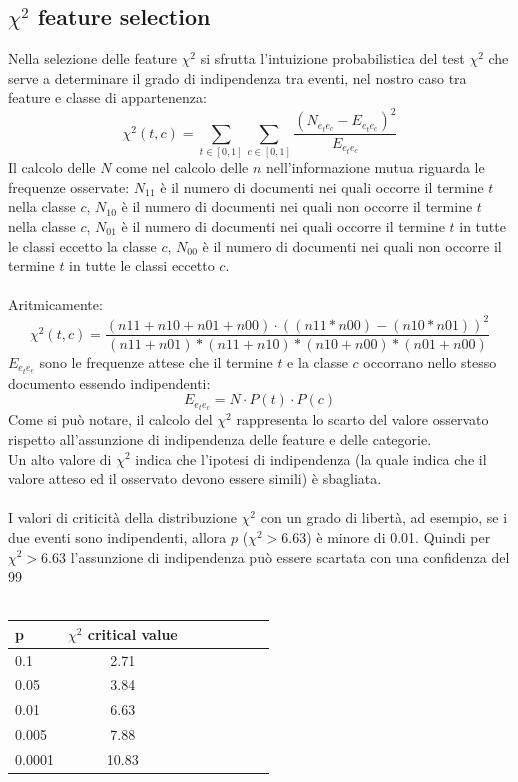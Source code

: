 \documentclass{article}
\theoremstyle{plain}
\theoremstyle{definition}
\begin{document}
\subsection{$\chi^2$ feature selection}
Nella selezione delle feature $\chi^2$ si sfrutta l'intuizione probabilistica del test $\chi^2$ che serve a determinare il grado di indipendenza tra eventi, nel nostro caso tra feature e classe di appartenenza:
$$\chi^2(t,c)=\sum_{t \in [0,1]} \sum_{c \in [0,1]} \frac{(N_{e_{t}e_{c}} - E_{e_{t}e_{c}})^2}{E_{e_{t}e_{c}}} $$  
Il calcolo delle $N$ come nel calcolo delle $n$ nell'informazione mutua riguarda le frequenze osservate: $N_{11}$ è il numero di documenti nei quali occorre il termine $t$ nella classe $c$, $N_{10}$ è il numero di documenti nei quali non occorre il termine $t$ nella classe $c$, $N_{01}$ è il numero di documenti nei quali occorre il termine $t$ in tutte le classi eccetto la classe $c$, $N_{00}$ è il numero di documenti nei quali non occorre il termine $t$ in tutte le classi eccetto $c$.
\\ 
\\
Aritmicamente:
$$\chi^2(t,c)=\frac{(n11+n10+n01+n00) \cdot ((n11*n00)-(n10*n01))^2}{(n11+n01)*(n11+n10)*(n10+n00)*(n01+n00)}
$$
$E_{e_{t}e_{c}}$ sono le frequenze attese che il termine $t$ e la classe $c$ occorrano nello stesso documento essendo indipendenti:
$$E_{e_{t}e_{c}} = N \cdot P(t) \cdot P(c)$$
Come si può notare, il calcolo del $\chi^2$ rappresenta lo scarto del valore osservato rispetto all'assunzione di indipendenza delle feature e delle categorie. 
\\
Un alto valore di $\chi^2$ indica che l'ipotesi di indipendenza (la quale indica che il valore atteso ed il osservato devono essere simili) è sbagliata.
\\
\\
I valori di criticità della distribuzione $\chi^2$ con un grado di libertà, ad esempio, se i due eventi sono indipendenti, allora $p$ ($\chi^2>6.63$) è minore di 0.01. Quindi per $\chi^2>6.63$ l'assunzione di indipendenza può essere scartata con una confidenza del 99%
\\
\\
\begin{tabular}{l*{6}{c}r}
p  & $\chi^2$ critical value \\
\hline
0.1 & 2.71 \\
0.05 & 3.84 \\
0.01 & 6.63 \\
0.005 & 7.88 \\
0.0001 & 10.83 \\

\end{tabular}
\end{document}
